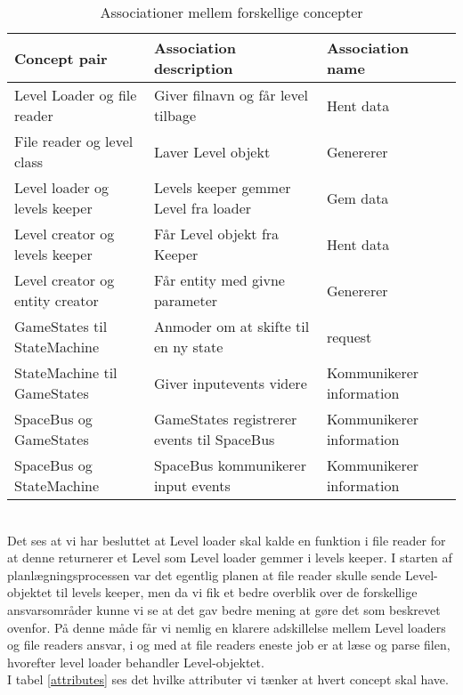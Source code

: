 \begin{table}[!h]
\centering
\begin{tabular}{|l|l|l|}
\hline
\textbf{Concept pair}           & \textbf{Association description}      & \textbf{Association name} \\ \hline
Level Loader og file reader     & Giver filnavn og får level tilbage    & Hent data                 \\ \hline
File reader og level class      & Laver Level objekt                    & Genererer                 \\ \hline
Level loader og levels keeper   & Levels keeper gemmer Level fra loader & Gem data                  \\ \hline
Level creator og levels keeper  & Får Level objekt fra Keeper           & Hent data                 \\ \hline
Level creator og entity creator & Får entity med givne parameter        & Genererer                 \\ \hline
GameStates til StateMachine & Anmoder om at skifte til en ny state & request \\ \hline
StateMachine til GameStates & Giver inputevents videre & Kommunikerer information \\\hline
SpaceBus og GameStates & GameStates registrerer events til SpaceBus & Kommunikerer information\\\hline
SpaceBus og StateMachine & SpaceBus kommunikerer input events & Kommunikerer information\\\hline 
\end{tabular}
\caption{Associationer mellem forskellige concepter}
\label{associations}
\end{table}\\
Det ses at vi har besluttet at Level loader skal kalde en funktion i file reader for at denne returnerer et Level som Level loader gemmer i levels keeper. I starten af planlægningsprocessen var det egentlig planen at file reader skulle sende Level-objektet til levels keeper, men da vi fik et bedre overblik over de forskellige ansvarsområder kunne vi se at det gav bedre mening at gøre det som beskrevet ovenfor. På denne måde får vi nemlig en klarere adskillelse mellem Level loaders og file readers ansvar, i og med at file readers eneste job er at læse og parse filen, hvorefter level loader behandler Level-objektet.\\
I tabel \ref{attributes} ses det hvilke attributer vi tænker at hvert concept skal have.
